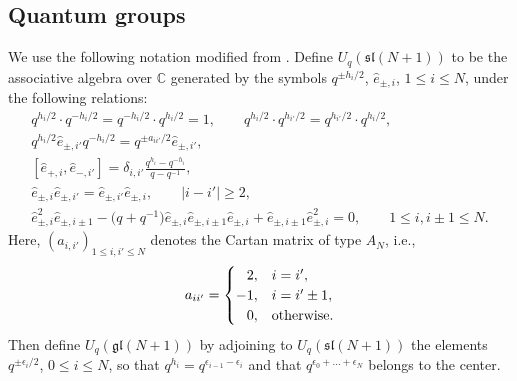 \documentclass[11pt]{article}
\numberwithin{equation}{section}
\numberwithin{equation}{section}
\begin{document}
\subsection{Quantum groups}
We use the following notation modified from \cite{Jimbo1986}.
Define $ U_q(\mathfrak{sl}(N+1)) $ to be the associative algebra over $ \mathbb{C} $ generated by the symbols $ q^{\pm h_i/2}$, $\hat{e}_{\pm, i}$, $1 \leq i\leq N$, under the following relations:
\begin{gather*}
q^{h_i/2} \cdot q^{-h_i/2}= q^{-h_i/2} \cdot q^{h_i/2}=1, \qquad q^{h_i/2} \cdot q^{h_{i'}/2}= q^{h_{i'}/2} \cdot q^{h_i/2},\nonumber\\
 q^{h_i/2} \hat{e}_{\pm, i'} q^{-h_i/2}= q^{\pm a_{ii'}/2} \hat{e}_{\pm, i'},\nonumber\\
[\hat{e}_{+,i}, \hat{e}_{-,i'}] =\delta_{i,i'} \frac{q^{h_i}-q^{-h_i}}{q-q^{-1}}, \nonumber\\
 \hat{e}_{\pm, i}\hat{e}_{\pm, i'} = \hat{e}_{\pm ,i'}\hat{e}_{\pm ,i}, \qquad |i-i'|\geq 2, \nonumber\\
 \hat{e}_{\pm, i}^2 \hat{e}_{\pm, i\pm 1} -\big(q+q^{-1}\big) \hat{e}_{\pm, i} \hat{e}_{\pm ,i\pm 1} \hat{e}_{\pm ,i} + \hat{e}_{\pm, i\pm 1} \hat{e}_{\pm, i}^2=0,\qquad 1\leq i, i\pm 1 \leq N. %
\end{gather*}
Here, $ (a_{i,i'})_{1\leq i,i' \leq N} $ denotes the Cartan matrix of type $ A_N $, i.e.,
\begin{equation*}
a_{ii'}=
\begin{cases}
\hphantom{-}2,& i = i',\\ -1, & i=i' \pm 1,\\ \hphantom{-}0,& \text{otherwise}.
\end{cases}
\end{equation*}
Then define $ U_q(\mathfrak{gl}(N+1)) $ by adjoining to $ U_q(\mathfrak{sl}(N+1)) $ the elements $ q^{\pm \epsilon_i/2}$, $0 \leq i \leq N $, so that $ q^{h_i}= q^{\epsilon_{i-1}-\epsilon_i} $ and that $ q^{\epsilon_0+\dots +\epsilon_N} $ belongs to the center.
\end{document}

